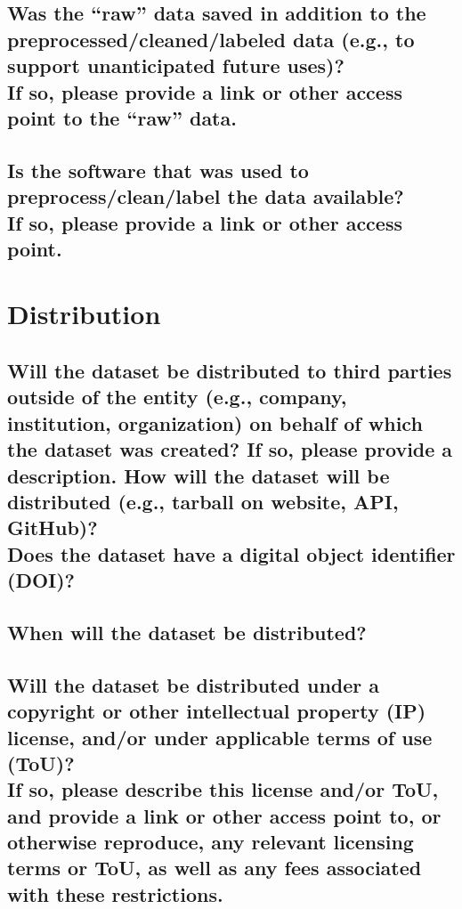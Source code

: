 \documentclass[letterpaper, 10 pt, conference]{ieeeconf}  %
\newcommand{\subtitle}[1]{{\\ \small \normalfont \color{purple} #1}}
\begin{document}
\lipsum[1]

\subsection{Was the “raw” data saved in addition to the preprocessed/cleaned/labeled data (e.g., to support unanticipated future uses)? \subtitle{If so, please provide a link or other access point to the “raw” data. }}

\lipsum[1]

\subsection{Is the software that was used to preprocess/clean/label the data available? \subtitle{If so, please provide a link or other access point.}}

\lipsum[1]

\section{Distribution}
\subsection{Will the dataset be distributed to third parties outside of the entity (e.g., company, institution, organization) on behalf of which the dataset was created? If so, please provide a description. How will the dataset will be distributed (e.g., tarball on website, API, GitHub)? \subtitle{Does the dataset have a digital object identifier (DOI)?}}

\lipsum[1]

\subsection{When will the dataset be distributed?}

\lipsum[1]

\subsection{Will the dataset be distributed under a copyright or other intellectual property (IP) license, and/or under applicable terms of use (ToU)? \subtitle{If so, please describe this license and/or ToU, and provide a link or other access point to, or otherwise reproduce, any relevant licensing terms or ToU, as well as any fees associated with these restrictions.}}
\end{document}

